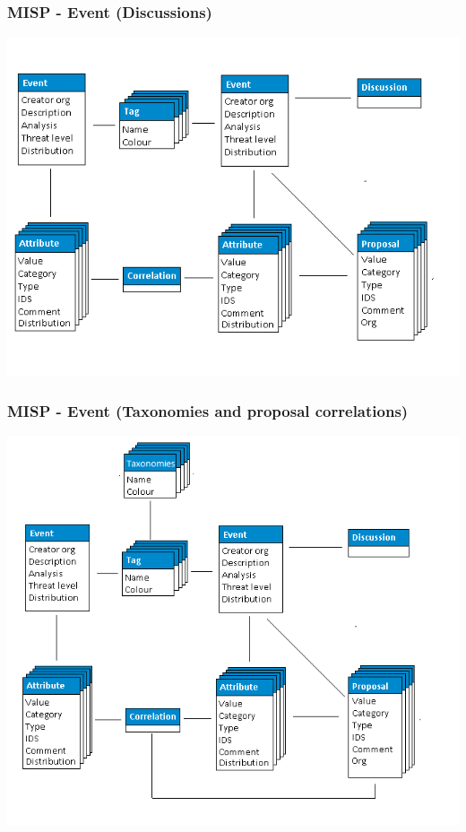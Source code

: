 \begin{frame}
    \frametitle{MISP - Event (Discussions)}
    \includegraphics[scale=0.45]{screenshots/datamodel6.png}
\end{frame}

\begin{frame}
    \frametitle{MISP - Event (Taxonomies and proposal correlations)}
    \includegraphics[scale=0.35]{screenshots/datamodel7.png}
\end{frame}

